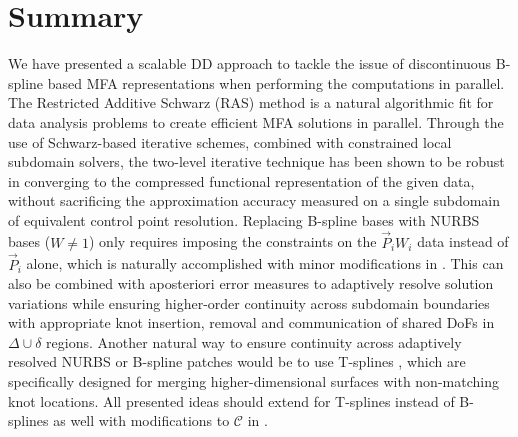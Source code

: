\section{Summary}
\label{sec:conclusions}


We have presented a scalable DD approach to tackle the issue of discontinuous B-spline based MFA representations when performing the computations in parallel. The Restricted Additive Schwarz (RAS) method is a natural algorithmic fit for data analysis problems to create efficient MFA solutions in parallel. Through the use of Schwarz-based iterative schemes, combined with constrained local subdomain solvers, the two-level iterative technique has been shown to be robust in converging to the compressed functional representation of the given data, without sacrificing the approximation accuracy measured on a single subdomain of equivalent control point resolution. Replacing B-spline bases with NURBS bases ($W \ne 1$) only requires imposing the constraints on the $\vec{P}_i W_i$ data instead of $\vec{P}_i$ alone, which is naturally accomplished with minor modifications in . This can also be combined with aposteriori error measures \cite{nashed-rational} to adaptively resolve solution variations while ensuring higher-order continuity across subdomain boundaries with appropriate knot insertion, removal and communication of shared DoFs in $\Delta \cup \delta$ regions. Another natural way to ensure continuity across adaptively resolved NURBS or B-spline patches would be to use T-splines \cite{sederberg-2004}, which are specifically designed for merging higher-dimensional surfaces with non-matching knot locations. All presented ideas should extend for T-splines instead of B-splines as well with modifications to $\mathcal{C}$  in .

